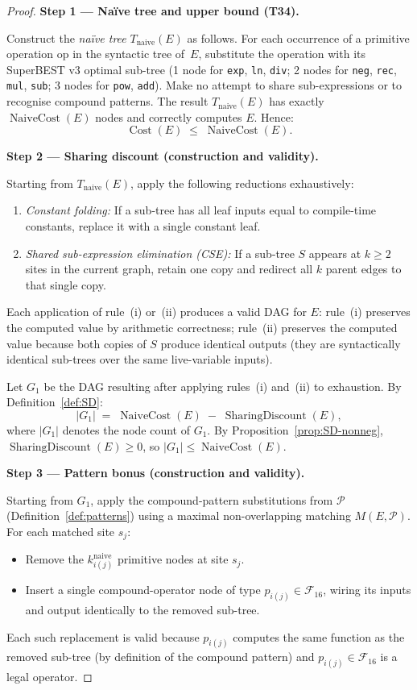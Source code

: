 \documentclass[12pt,a4paper]{article}
\theoremstyle{definition}
\newcommand{\Cost}{\operatorname{Cost}}
\newcommand{\NC}{\operatorname{NaiveCost}}
\newcommand{\SD}{\operatorname{SharingDiscount}}
\newcommand{\Tnaive}{T_{\mathrm{naive}}(E)}
\begin{document}
\begin{proof}
\textbf{Step 1 --- Na\"{i}ve tree and upper bound (T34).}

Construct the \emph{na\"{i}ve tree} $\Tnaive$ as follows.  For each occurrence
of a primitive operation $\mathrm{op}$ in the syntactic tree of~$E$, substitute
the operation with its SuperBEST v3 optimal sub-tree (1 node for \texttt{exp},
\texttt{ln}, \texttt{div}; 2 nodes for \texttt{neg}, \texttt{rec},
\texttt{mul}, \texttt{sub}; 3 nodes for \texttt{pow}, \texttt{add}).  Make no
attempt to share sub-expressions or to recognise compound patterns.  The result
$\Tnaive$ has exactly $\NC(E)$ nodes and correctly computes $E$.  Hence:
\[
  \Cost(E) \;\leq\; \NC(E).
\]

\textbf{Step 2 --- Sharing discount (construction and validity).}

Starting from $\Tnaive$, apply the following reductions exhaustively:
\begin{enumerate}
  \item \emph{Constant folding:} If a sub-tree has all leaf inputs equal to
        compile-time constants, replace it with a single constant leaf.
  \item \emph{Shared sub-expression elimination (CSE):} If a sub-tree $S$
        appears at $k \geq 2$ sites in the current graph, retain one copy and
        redirect all $k$ parent edges to that single copy.
\end{enumerate}
Each application of rule~(i) or~(ii) produces a valid DAG for $E$: rule~(i)
preserves the computed value by arithmetic correctness; rule~(ii) preserves
the computed value because both copies of $S$ produce identical outputs
(they are syntactically identical sub-trees over the same live-variable
inputs).

Let $G_1$ be the DAG resulting after applying rules~(i) and~(ii) to
exhaustion.  By Definition~\ref{def:SD}:
\[
  |G_1| \;=\; \NC(E) \;-\; \SD(E),
\]
where $|G_1|$ denotes the node count of $G_1$.  By
Proposition~\ref{prop:SD-nonneg}, $\SD(E) \geq 0$, so $|G_1| \leq \NC(E)$.

\textbf{Step 3 --- Pattern bonus (construction and validity).}

Starting from $G_1$, apply the compound-pattern substitutions from
$\mathcal{P}$ (Definition~\ref{def:patterns}) using a maximal non-overlapping
matching $M(E, \mathcal{P})$.  For each matched site $s_j$:
\begin{itemize}
  \item Remove the $k_{i(j)}^{\mathrm{naive}}$ primitive nodes at site $s_j$.
  \item Insert a single compound-operator node of type $p_{i(j)} \in
        \mathcal{F}_{16}$, wiring its inputs and output identically to the
        removed sub-tree.
\end{itemize}
Each such replacement is valid because $p_{i(j)}$ computes the same
function as the removed sub-tree (by definition of the compound pattern) and
$p_{i(j)} \in \mathcal{F}_{16}$ is a legal operator.


\end{proof}
\end{document}
